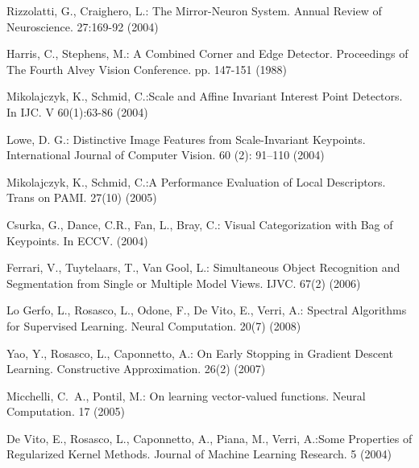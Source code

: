 \begin{thebibliography}{4}

 Rizzolatti, G., Craighero, L.: The Mirror-Neuron System. Annual Review of Neuroscience. 27:169-92 (2004)

 Harris, C., Stephens, M.: A Combined Corner and Edge Detector. Proceedings of The Fourth Alvey Vision Conference. pp. 147-151 (1988)

 Mikolajczyk, K., Schmid, C.:Scale and Affine Invariant Interest Point Detectors. In IJC. V 60(1):63-86 (2004)

 Lowe, D. G.: Distinctive Image Features from Scale-Invariant Keypoints. International Journal of Computer Vision. 60 (2): 91–110 (2004) 



 Mikolajczyk, K., Schmid, C.:A Performance Evaluation of Local Descriptors. Trans on PAMI. 27(10) (2005)


 Csurka, G., Dance, C.R., Fan, L., Bray, C.: Visual Categorization with Bag of Keypoints. In ECCV. (2004)

 Ferrari, V., Tuytelaars, T., Van Gool, L.: Simultaneous Object Recognition and Segmentation from Single or Multiple Model Views. IJVC. 67(2) (2006)

 Lo Gerfo, L., Rosasco, L., Odone, F., De Vito, E., Verri, A.:
  Spectral Algorithms for Supervised Learning. Neural Computation. 20(7) (2008)

   Yao, Y., Rosasco, L., Caponnetto, A.: On Early Stopping in Gradient Descent Learning.
   Constructive Approximation. 26(2) (2007)

 Micchelli, C.~A., Pontil, M.: On learning vector-valued functions.
  Neural Computation. 17 (2005)

 De Vito, E., Rosasco, L., Caponnetto, A., Piana, M.,	Verri, A.:Some Properties of Regularized Kernel Methods. Journal of Machine Learning Research. 5 (2004)


\end{thebibliography}
